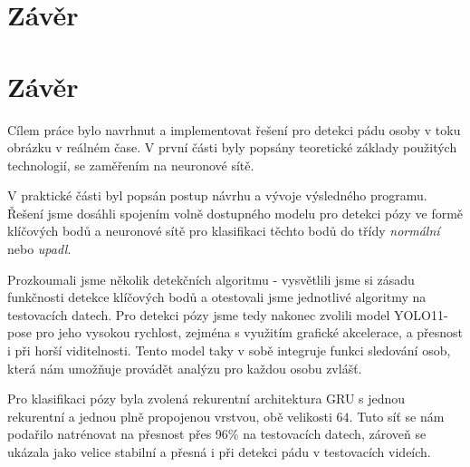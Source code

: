 \chapter{Závěr}
\label{chap:Conclusion}

\chapter{Závěr}
\label{chap:Conclusion}

Cílem práce bylo navrhnut a implementovat řešení pro detekci pádu osoby v toku
obrázku v reálném čase. V první části byly popsány teoretické základy použitých
technologií, se zaměřením na neuronové sítě.

V praktické části byl popsán postup návrhu a vývoje výsledného programu. Řešení
jsme dosáhli spojením volně dostupného modelu pro detekci pózy ve formě
klíčových bodů a neuronové sítě pro klasifikaci těchto bodů do třídy
\textit{normální} nebo \textit{upadl}.

Prozkoumali jsme několik detekčních algoritmu - vysvětlili jsme si zásadu funkčnosti detekce klíčových bodů a otestovali jsme jednotlivé algoritmy na testovacích datech.
Pro detekci pózy jsme tedy nakonec zvolili model YOLO11-pose pro jeho vysokou rychlost,
zejména s využitím grafické akcelerace, a přesnost i při horší viditelnosti.
Tento model taky v sobě integruje funkci sledování osob, která nám umožňuje provádět analýzu pro
každou osobu zvlášť.

Pro klasifikaci pózy byla zvolená rekurentní architektura GRU s jednou
rekurentní a jednou plně propojenou vrstvou, obě velikosti $64$. Tuto síť se
nám podařilo natrénovat na přesnost přes 96\% na testovacích datech, zároveň se
ukázala jako velice stabilní a přesná i při detekci pádu v testovacích videích.

\endinput
\endinput